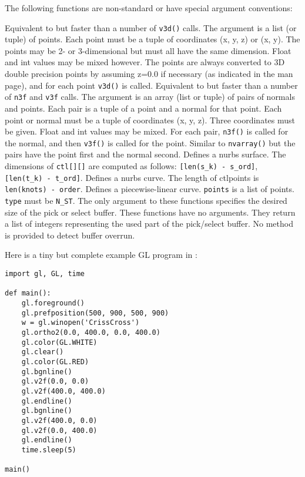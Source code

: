 The following functions are non-standard or have special argument
conventions:
\begin{description}
Equivalent to but faster than a number of
{\tt v3d()}
calls.
The argument is a list (or tuple) of points.
Each point must be a tuple of coordinates (x, y, z) or (x, y).
The points may be 2- or 3-dimensional but must all have the
same dimension.
Float and int values may be mixed however.
The points are always converted to 3D double precision points
by assuming z=0.0 if necessary (as indicated in the man page),
and for each point
{\tt v3d()}
is called.
Equivalent to but faster than a number of
{\tt n3f}
and
{\tt v3f}
calls.
The argument is an array (list or tuple) of pairs of normals and points.
Each pair is a tuple of a point and a normal for that point.
Each point or normal must be a tuple of coordinates (x, y, z).
Three coordinates must be given.
Float and int values may be mixed.
For each pair,
{\tt n3f()}
is called for the normal, and then
{\tt v3f()}
is called for the point.
Similar to
{\tt nvarray()}
but the pairs have the point first and the normal second.
\itembreak
Defines a nurbs surface.
The dimensions of
{\tt ctl[][]}
are computed as follows:
{\tt [len(s\_k)~-~s\_ord]},
{\tt [len(t\_k)~-~t\_ord]}.
Defines a nurbs curve.
The length of ctlpoints is
{\tt len(knots)~-~order}.
Defines a piecewise-linear curve.
{\tt points}
is a list of points.
{\tt type}
must be
{\tt N\_ST}.
The only argument to these functions specifies the desired size of the
pick or select buffer.
These functions have no arguments.
They return a list of integers representing the used part of the
pick/select buffer.
No method is provided to detect buffer overrun.
\end{description}

Here is a tiny but complete example GL program in {\Python}:
\bcode\begin{verbatim}
import gl, GL, time

def main():
    gl.foreground()
    gl.prefposition(500, 900, 500, 900)
    w = gl.winopen('CrissCross')
    gl.ortho2(0.0, 400.0, 0.0, 400.0)
    gl.color(GL.WHITE)
    gl.clear()
    gl.color(GL.RED)
    gl.bgnline()
    gl.v2f(0.0, 0.0)
    gl.v2f(400.0, 400.0)
    gl.endline()
    gl.bgnline()
    gl.v2f(400.0, 0.0)
    gl.v2f(0.0, 400.0)
    gl.endline()
    time.sleep(5)

main()
\end{verbatim}\ecode


